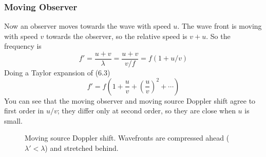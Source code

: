 \documentclass{report}
\numberwithin{equation}{section}
\begin{document}
\subsubsection{Moving Observer}
Now an observer moves towards the wave with speed $u$. The wave front is moving with speed $v$ towards the observer, so the relative speed is $v+u$. So the frequency is
\begin{equation}
	f' = \frac{u+v}{\lambda} = \frac{u+v}{v/f} = f(1+u/v)
\end{equation}
Doing a Taylor expansion of (6.3)
\begin{equation}
	f' = f\left(1+\frac{u}{v} + \left(\frac{u}{v}\right)^2 + \cdots\right)
\end{equation}
You can see that the moving observer and moving source Doppler shift agree to first order in $u/v$; they differ only at second order, so they are close when $u$ is small.
\begin{figure}[H]
\centering
{}
\caption{Moving source Doppler shift. Wavefronts are compressed ahead
($\lambda' < \lambda$) and stretched behind.}
\label{fig:doppler_source}
\end{figure}
\end{document}
